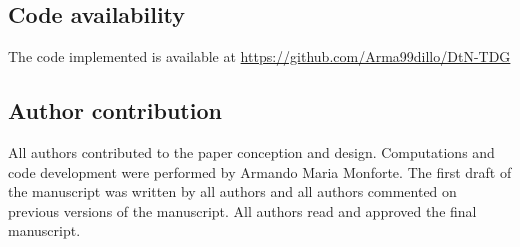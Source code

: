 \documentclass[a4paper,10pt]{article}
\begin{document}
\subsection*{Code availability} The code implemented is available at \url{https://github.com/Arma99dillo/DtN-TDG}

\subsection*{Author contribution} All authors contributed to the paper conception and design. Computations and code development were performed by Armando Maria Monforte. The first draft of the manuscript was written by all authors and all authors commented on previous versions of the manuscript. All authors read and approved the final manuscript.


\printbibliography
\end{document}
